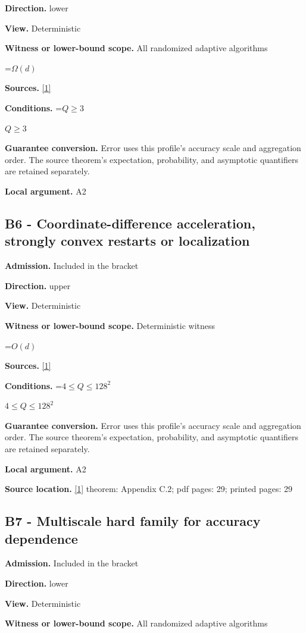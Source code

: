 \documentclass[10pt,a4paper]{article}
\newcommand{\AtlasMath}[1]{\par\begingroup\centering\setbox0=\hbox{$\displaystyle #1$}\ifdim\wd0>1.4\linewidth\typeout{ATLAS WIDE FORMULA: \the\wd0}\fi\ifdim\wd0>\linewidth\resizebox{\linewidth}{!}{\box0}\else\box0\fi\par\endgroup}
\newcommand{\AtlasInlineMath}[1]{\begingroup\setbox0=\hbox{$#1$}\ifdim\wd0>.4\linewidth\endgroup\AtlasMath{#1}\else\endgroup$#1$\fi}
\begin{document}
\textbf{Direction.} lower

\textbf{View.} Deterministic

\textbf{Witness or lower-bound scope.} All randomized adaptive algorithms

\AtlasMath{\Omega(d)}
\textbf{Sources.} \href{https://arxiv.org/html/2610.00345v1}{[1]}

\textbf{Conditions.} \AtlasInlineMath{Q\ge3}

\textbf{Guarantee conversion.} Error uses this profile's accuracy scale and aggregation order. The source theorem's expectation, probability, and asymptotic quantifiers are retained separately.

\textbf{Local argument.} A2

\subsection{B6 - Coordinate-difference acceleration, strongly convex restarts or localization}
\textbf{Admission.} Included in the bracket

\textbf{Direction.} upper

\textbf{View.} Deterministic

\textbf{Witness or lower-bound scope.} Deterministic witness

\AtlasMath{O(d)}
\textbf{Sources.} \href{https://arxiv.org/html/2610.00345v1}{[1]}

\textbf{Conditions.} \AtlasInlineMath{4\le Q\le128^2}

\textbf{Guarantee conversion.} Error uses this profile's accuracy scale and aggregation order. The source theorem's expectation, probability, and asymptotic quantifiers are retained separately.

\textbf{Local argument.} A2

\textbf{Source location.} \href{https://arxiv.org/html/2610.00345v1}{[1]} theorem: Appendix C.2; pdf pages: 29; printed pages: 29

\subsection{B7 - Multiscale hard family for accuracy dependence}
\textbf{Admission.} Included in the bracket

\textbf{Direction.} lower

\textbf{View.} Deterministic

\textbf{Witness or lower-bound scope.} All randomized adaptive algorithms
\end{document}
